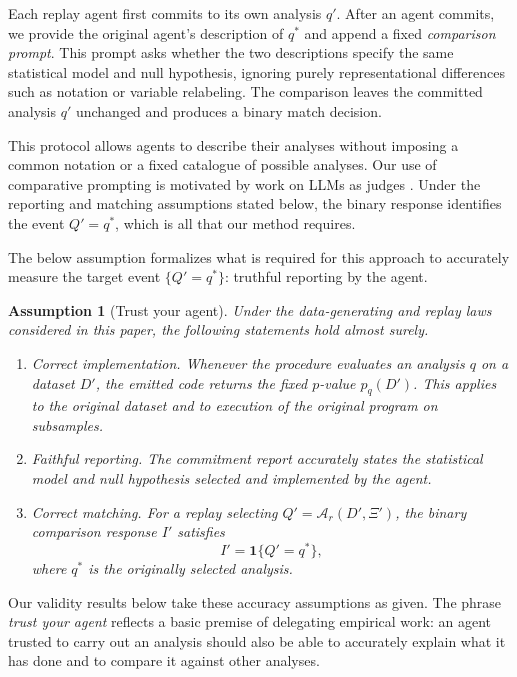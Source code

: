 \documentclass[10pt]{article}
\newtheorem{assumption}{Assumption}
\begin{document}
Each replay agent first commits to its own analysis $q'$. After an agent commits, we provide the original agent's description of $q^*$ and append a fixed \textit{comparison prompt}. This prompt asks whether the two descriptions specify the same statistical model and null hypothesis, ignoring purely representational differences such as notation or variable relabeling. The comparison leaves the committed analysis $q'$ unchanged and produces a binary match decision.

This protocol allows agents to describe their analyses without imposing a common notation or a fixed catalogue of possible analyses. Our use of comparative prompting is motivated by work on LLMs as judges \citep[see, e.g.][]{zheng2023judging}. Under the reporting and matching assumptions stated below, the binary response identifies the event $Q'=q^*$, which is all that our method requires.

The below assumption formalizes what is required for this approach to accurately measure the target event $\{Q' = q^*\}$: truthful reporting by the agent.
\begin{assumption}[Trust your agent]
\label{asspt:trust}
Under the data-generating and replay laws considered in this paper, the following statements hold almost surely.
\begin{enumerate}[label=(\roman*)]
\item \textit{Correct implementation.}
Whenever the procedure evaluates an analysis $q$ on a dataset $D'$, the emitted code returns the fixed $p$-value $p_q(D')$. This applies to the original dataset and to execution of the original program on subsamples.

\item \textit{Faithful reporting.}
The commitment report accurately states the statistical model and null hypothesis selected and implemented by the agent.

\item \textit{Correct matching.}
For a replay selecting
$Q'=\mathcal A_r(D',\Xi')$, the binary comparison response $I'$ satisfies
\[
I'=\mathbf{1}\{Q'=q^*\},
\] where $q^*$ is the originally selected analysis.
\end{enumerate}
\end{assumption}

Our validity results below take these accuracy assumptions as given. The phrase \textit{trust your agent} reflects a basic premise of delegating empirical work: an agent trusted to carry out an analysis should also be able to accurately explain what it has done and to compare it against other analyses.
\end{document}
